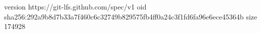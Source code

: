 version https://git-lfs.github.com/spec/v1
oid sha256:292a9b8d7b33a7f460c6c32749b829575fb4ff0a24c3f1fd6fa96e6ece45364b
size 174928
